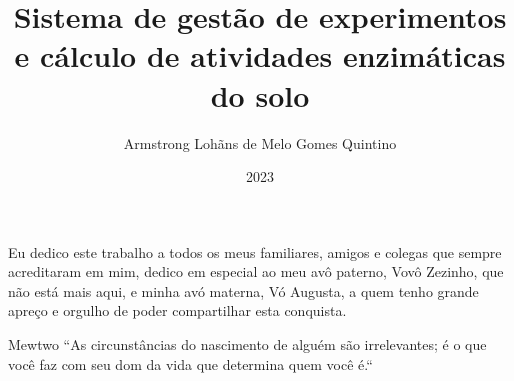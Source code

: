 \documentclass[pt,oneside,onehalfspacing,bsc]{risethesis}
\title{Sistema de gestão de experimentos e cálculo de atividades enzimáticas do solo}
\date{2023}
\author{Armstrong Lohãns de Melo Gomes Quintino}
\begin{document}
\frontmatter

\frontpage

\presentationpage

\begin{fichacatalografica}
\end{fichacatalografica}

\banca


\begin{dedicatory}
Eu dedico este trabalho a todos os meus familiares, amigos e colegas que sempre acreditaram em mim, dedico em especial ao meu avô paterno, Vovô Zezinho, que não está mais aqui, e minha avó materna, Vó Augusta, a quem tenho grande apreço e orgulho de poder compartilhar esta conquista.
\end{dedicatory}

\acknowledgements


\begin{epigraph}[]{ Mewtwo}
``As circunstâncias do nascimento de alguém são irrelevantes; é o que você faz com seu dom da vida que determina quem você é.``
\end{epigraph}

\resumo


\abstract


\listoffigures

\listoftables

\listofacronyms


\tableofcontents

\mainmatter









\begin{references}
  
\end{references}


\theappendix\label{appendix}


\end{document}
